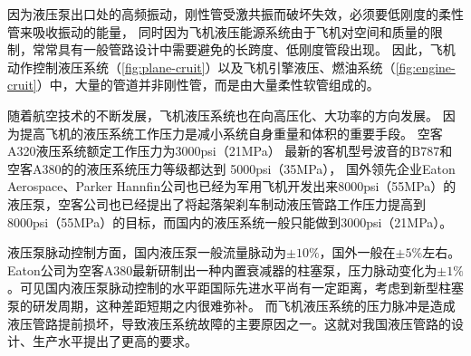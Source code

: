因为液压泵出口处的高频振动，刚性管受激共振而破坏失效，必须要低刚度的柔性管来吸收振动的能量，
同时因为飞机液压能源系统由于飞机对空间和质量的限制，常常具有一般管路设计中需要避免的长跨度、低刚度管段出现\cite{gaofeng2013}。
因此，飞机动作控制液压系统（\ref{fig:plane-cruit}）以及飞机引擎液压、燃油系统（\ref{fig:engine-cruit}）中，大量的管道并非刚性管，而是由大量柔性软管组成的。


随着航空技术的不断发展，飞机液压系统也在向高压化、大功率的方向发展。
因为提高飞机的液压系统工作压力是减小系统自身重量和体积的重要手段。
空客A320液压系统额定工作压力为3000psi（21MPa）
最新的客机型号波音的B787和空客A380的的液压系统压力等级都达到 5000psi（35MPa）\cite{lavooij1991}，
国外领先企业Eaton Aerospace、Parker Hannfin公司也已经为军用飞机开发出来8000psi（55MPa）的液压泵，空客公司也已经提出了将起落架刹车制动液压管路工作压力提高到8000psi（55MPa）的目标，而国内的液压系统一般只能做到3000psi（21MPa）。


\begin{figure}
	\centering
	\hspace{1cm}
	\label{fig:hose fail}
\end{figure}





液压泵脉动控制方面，国内液压泵一般流量脉动为$\pm10\%$，国外一般在$ \pm5\% $左右\cite{lijun2007}。Eaton公司为空客A380最新研制出一种内置衰减器的柱塞泵，压力脉动变化为$ \pm 1\%$。可见国内液压泵脉动控制的水平距国际先进水平尚有一定距离，考虑到新型柱塞泵的研发周期，这种差距短期之内很难弥补。
而飞机液压系统的压力脉冲是造成液压管路提前损坏，导致液压系统故障的主要原因之一。这就对我国液压管路的设计、生产水平提出了更高的要求。





